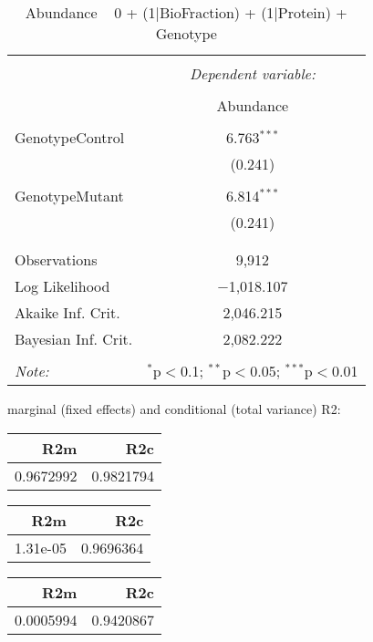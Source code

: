 \documentclass[11pt]{report}
\begin{document}
\begin{table}[!htbp] \centering 
  \caption{Abundance ~ 0 + (1|BioFraction) + (1|Protein) + Genotype} 
  \label{} 
\begin{tabular}{@{\extracolsep{5pt}}lc} 
\\[-1.8ex]\hline 
\hline \\[-1.8ex] 
 & \multicolumn{1}{c}{\textit{Dependent variable:}} \\ 
\cline{2-2} 
\\[-1.8ex] & Abundance \\ 
\hline \\[-1.8ex] 
 GenotypeControl & 6.763$^{***}$ \\ 
  & (0.241) \\ 
  & \\ 
 GenotypeMutant & 6.814$^{***}$ \\ 
  & (0.241) \\ 
  & \\ 
\hline \\[-1.8ex] 
Observations & 9,912 \\ 
Log Likelihood & $-$1,018.107 \\ 
Akaike Inf. Crit. & 2,046.215 \\ 
Bayesian Inf. Crit. & 2,082.222 \\ 
\hline 
\hline \\[-1.8ex] 
\textit{Note:}  & \multicolumn{1}{r}{$^{*}$p$<$0.1; $^{**}$p$<$0.05; $^{***}$p$<$0.01} \\ 
\end{tabular} 
\end{table} 
marginal (fixed effects) and conditional (total variance) R2:

\begin{tabular}{r|r}
\hline
R2m & R2c\\
\hline
0.9672992 & 0.9821794\\
\hline
\end{tabular}

\begin{tabular}{r|r}
\hline
R2m & R2c\\
\hline
1.31e-05 & 0.9696364\\
\hline
\end{tabular}

\begin{tabular}{r|r}
\hline
R2m & R2c\\
\hline
0.0005994 & 0.9420867\\
\hline
\end{tabular}
\end{document}
